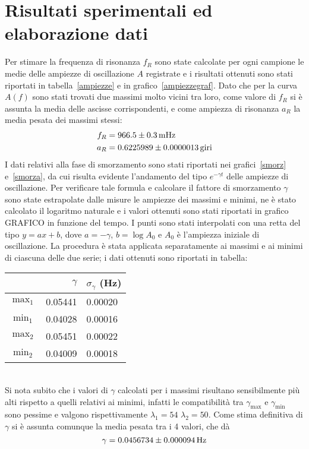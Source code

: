\documentclass[italian,a4paper]{article}
\begin{document}
\section{Risultati sperimentali ed elaborazione dati}
Per stimare la frequenza di risonanza $f_R$ sono state calcolate per ogni campione le medie delle ampiezze di oscillazione $A$ registrate e i risultati ottenuti sono stati riportati in tabella~\ref{ampiezze} e in grafico~\ref{ampiezzegraf}. Dato che per la curva $A(f)$ sono stati trovati due massimi molto vicini tra loro, come valore di $f_R$ si è assunta la media delle ascisse corrispondenti, e come ampiezza di risonanza $a_R$ la media pesata dei massimi stessi:
	\begin{align*}
	f_R &= \unit[966.5\pm 0.3]{mHz}\\
	a_R &= \unit[0.6225989 \pm 0.0000013]{giri}
	\end{align*}
I dati relativi alla fase di smorzamento sono stati riportati nei grafici~\ref{smorz} e~\ref{smorza}, da cui risulta evidente l'andamento del tipo $e^{-\gamma t}$ delle ampiezze di oscillazione. Per verificare tale formula e calcolare il fattore di smorzamento $\gamma$ sono state estrapolate dalle misure le ampiezze dei massimi e minimi, ne è stato calcolato il logaritmo naturale e i valori ottenuti sono stati riportati in grafico GRAFICO in funzione del tempo. I punti sono stati interpolati con una retta del tipo $y = ax+b$, dove $a=-\gamma$, $b=\log{A_0}$ e  $A_0$ è l'ampiezza iniziale di oscillazione. La procedura è stata applicata separatamente ai massimi e ai minimi di ciascuna delle due serie; i dati ottenuti sono riportati in tabella:
\begin{table}[!h]\centering
\begin{tabular}{cr@{  $\pm$ }l}
 & $\gamma$	&	$\sigma_\gamma$ (Hz)\\\hline
$\max_1$ &0.05441 & 0.00020\\
$\min_1$ &0.04028 & 0.00016\\
$\max_2$ &0.05451 & 0.00022\\
$\min_2$ &0.04009 & 0.00018
\end{tabular}
\end{table}
\\
Si nota subito che i valori di $\gamma$ calcolati per i massimi risultano sensibilmente più alti rispetto a quelli relativi ai minimi, infatti le compatibilità tra $\gamma_{\max}$ e $\gamma_{\min}$ sono pessime e valgono rispettivamente $\lambda_1=54$  $\lambda_2=50$.
Come stima definitiva di $\gamma$ si è assunta comunque la media pesata tra i 4 valori, che dà
\begin{equation*}
\gamma=\unit[0.0456734 \pm 0.000094]{Hz}
\end{equation*}
\end{document}
